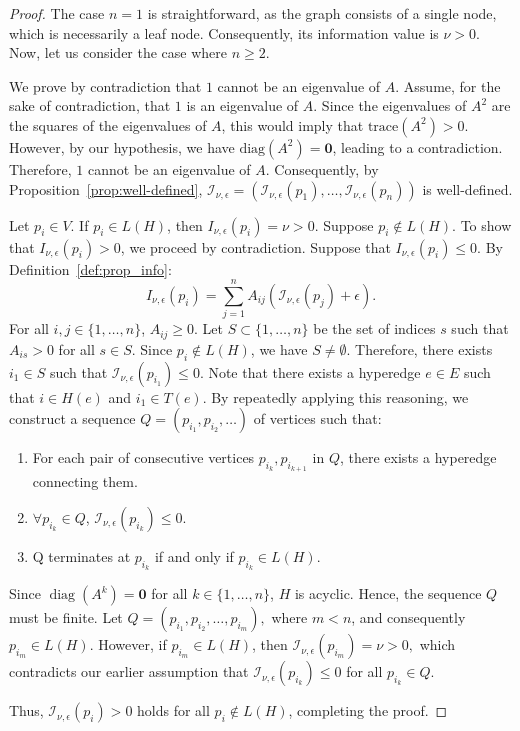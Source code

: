 \documentclass[11pt]{article}
\theoremstyle{definition}
\theoremstyle{plain}
\theoremstyle{remark}
\begin{document}
\begin{proof}
The case \( n = 1 \) is straightforward, as the graph consists of a single node, which is necessarily a leaf node. Consequently, its information value is \( \nu > 0 \). Now, let us consider the case where \( n \geq 2 \).

We prove by contradiction that \( 1 \) cannot be an eigenvalue of \( A \). Assume, for the sake of contradiction, that \( 1 \) is an eigenvalue of \( A \). Since the eigenvalues of \( A^2 \) are the squares of the eigenvalues of \( A \), this would imply that \( \text{trace}(A^2) > 0 \). However, by our hypothesis, we have \( \text{diag}(A^2) = \mathbf{0} \), leading to a contradiction. Therefore, \( 1 \) cannot be an eigenvalue of \( A \). Consequently, by Proposition~\ref{prop:well-defined}, \( \mathcal{I}_{\nu, \epsilon} = (\mathcal{I}_{\nu, \epsilon}(p_1), \ldots, \mathcal{I}_{\nu, \epsilon}(p_n)) \) is well-defined.

Let $p_i \in V$. If $p_i \in L(H)$, then $I_{\nu, \epsilon}(p_i) = \nu > 0$. Suppose $p_i \notin L(H)$. To show that $I_{\nu, \epsilon}(p_i) > 0$, we proceed by contradiction. Suppose that $I_{\nu, \epsilon}(p_i) \leq 0$. By Definition~\ref{def:prop_info}:
\[
I_{\nu, \epsilon}(p_i)=\sum_{j=1}^{n} A_{ij} (\mathcal{I}_{\nu, \epsilon}(p_j) + \epsilon).
\]
For all \( i, j \in \{1, \ldots, n\} \), \( A_{ij} \geq 0 \). Let \( S \subset \{1, \ldots, n\} \) be the set of indices \( s \) such that \( A_{is} > 0 \) for all \( s \in S \). Since \( p_i \notin L(H) \), we have \( S \neq \emptyset \). Therefore, there exists \( i_1 \in S \) such that \( \mathcal{I}_{\nu,\epsilon}(p_{i_1}) \leq 0 \). Note that there exists a hyperedge \( e \in E \) such that \( i \in H(e) \) and \( i_1 \in T(e) \). By repeatedly applying this reasoning, we construct a sequence 
$Q = (p_{i_1}, p_{i_2}, \ldots)$ of vertices such that:
\begin{enumerate}
    \item For each pair of consecutive vertices \( p_{i_k}, p_{i_{k+1}} \) in \( Q \), there exists a hyperedge connecting them.
    \item \( \forall p_{i_k} \in Q \), \( \mathcal{I}_{\nu,\epsilon}(p_{i_k}) \leq 0 \).
    \item Q terminates at $p_{i_k}$ if and only if $p_{i_k}\in L(H)$.
\end{enumerate}

Since \( \operatorname{diag}(A^k) = \mathbf{0} \) for all \( k \in \{1, \ldots, n\} \), \( H \) is acyclic. Hence, the sequence \( Q \) must be finite. Let $ Q = (p_{i_1}, p_{i_2}, \ldots, p_{i_m}), $
where \( m < n \), and consequently \( p_{i_m} \in L(H) \). However, if \( p_{i_m} \in L(H) \), then 
$ \mathcal{I}_{\nu,\epsilon}(p_{i_m}) = \nu > 0, $
which contradicts our earlier assumption that \( \mathcal{I}_{\nu,\epsilon}(p_{i_k}) \leq 0 \) for all \( p_{i_k} \in Q \).

Thus, \( \mathcal{I}_{\nu,\epsilon}(p_i) > 0 \) holds for all \( p_i \notin L(H) \), completing the proof.


\end{proof}
\end{document}
